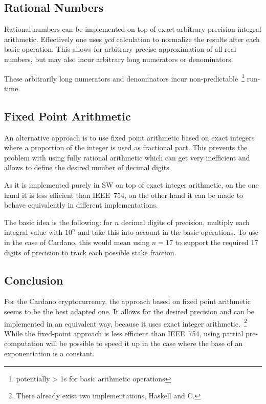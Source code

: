 \documentclass[11pt,a4paper,dvipsnames]{article}
\theoremstyle{definition}
\theoremstyle{definition}
\begin{document}
\subsection{Rational Numbers}
\label{sec:rational-numbers}

Rational numbers can be implemented on top of exact arbitrary precision integral
arithmetic. Effectively one uses \emph{gcd} calculation to normalize the results
after each basic operation. This allows for arbitrary precise approximation of
all real numbers, but may also incur arbitrary long numerators or denominators.

These arbitrarily long numerators and denominators incur
non-predictable~\footnote{potentially > 1s for basic arithmetic operations}
run-time.

\subsection{Fixed Point Arithmetic}
\label{sec:fixed-point-arithm}

An alternative approach is to use fixed point arithmetic based on exact integers
where a proportion of the integer is used as fractional part. This prevents the
problem with using fully rational arithmetic which can get very inefficient and
allows to define the desired number of decimal digits.

As it is implemented purely in SW on top of exact integer arithmetic, on the one
hand it is less efficient than IEEE~754, on the other hand it can be made to
behave equivalently in different implementations.

The basic idea is the following: for $n$ decimal digits of precision, multiply
each integral value with $10^{n}$ and take this into account in the basic
operations. To use in the case of Cardano, this would mean using $n=17$ to
support the required 17 digits of precision to track each possible stake
fraction.

\subsection{Conclusion}
\label{sec:summary}

For the Cardano cryptocurrency, the approach based on fixed point arithmetic
seems to be the best adapted one. It allows for the desired precision and can be
implemented in an equivalent way, because it uses exact integer
arithmetic.~\footnote{There already exist two implementations, Haskell and C.}
While the fixed-point approach is less efficient than IEEE~754, using partial
pre-computation will be possible to speed it up in the case where the base of an
exponentiation is a constant.
\end{document}

